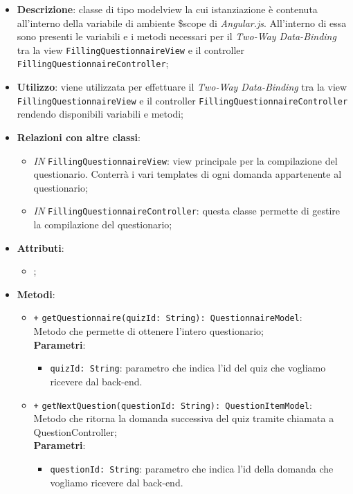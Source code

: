 	\begin{itemize}
		\item \textbf{Descrizione}: classe di tipo modelview la cui istanziazione è contenuta all'interno della variabile di ambiente \$scope di \textit{Angular.js}. All'interno di essa sono presenti le variabili e i metodi necessari per il \textit{Two-Way Data-Binding} tra la view \texttt{FillingQuestionnaireView} e il controller \texttt{FillingQuestionnaireController};
		\item \textbf{Utilizzo}: viene utilizzata per effettuare il \textit{Two-Way Data-Binding} tra la view \texttt{FillingQuestionnaireView} e il controller \texttt{FillingQuestionnaireController} rendendo disponibili variabili e metodi;
		\item \textbf{Relazioni con altre classi}: 
		\begin{itemize}
			\item \textit{IN} \texttt{FillingQuestionnaireView}: view principale per la compilazione del questionario. Conterrà i vari templates di ogni domanda appartenente al questionario; 
			\item \textit{IN} \texttt{FillingQuestionnaireController}: questa classe permette di gestire la compilazione del questionario;
		\end{itemize}
		\item \textbf{Attributi}: 
		\begin{itemize}
			\item ;
		\end{itemize}
		\item \textbf{Metodi}: 
		\begin{itemize}
			\item \texttt{+} \texttt{getQuestionnaire(quizId: String): QuestionnaireModel}: \\ Metodo che permette di ottenere l'intero questionario; \\
			\textbf{Parametri}:
			\begin{itemize}
				\item \texttt{quizId: String}: parametro che indica l'id del quiz che vogliamo ricevere dal back-end.
			\end{itemize}
			\item \texttt{+} \texttt{getNextQuestion(questionId: String): QuestionItemModel}: \\ Metodo che ritorna la domanda successiva del quiz tramite chiamata a QuestionController; \\
			\textbf{Parametri}:
			\begin{itemize}
				\item \texttt{questionId: String}: parametro che indica l'id della domanda che vogliamo ricevere dal back-end.
			\end{itemize}
		\end{itemize}
	\end{itemize}
	
